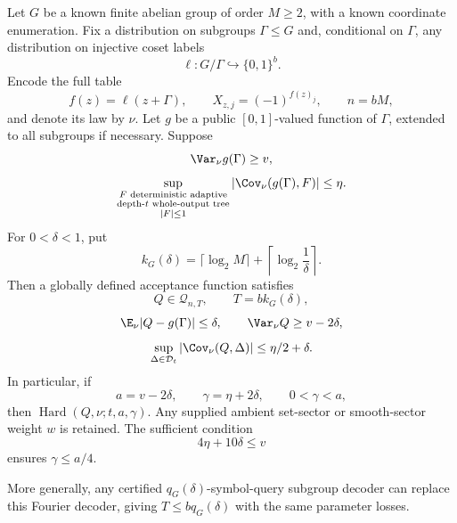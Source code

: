 \begin{theorem}\label{ian:period-hsp-finite-hsp}
Let \(G\) be a known finite abelian group of order \(M\ge2\), with a known coordinate enumeration. Fix a distribution on subgroups \(\Gamma\le G\) and, conditional on \(\Gamma\), any distribution on injective coset labels
\[
 \ell:G/\Gamma\hookrightarrow\{0,1\}^b.
\]
Encode the full table
\[
 f(z)=\ell(z+\Gamma),\qquad
 X_{z,j}=(-1)^{f(z)_j},\qquad n=bM,
\]
and denote its law by \(\nu\).
Let \(g\) be a public \([0,1]\)-valued function of \(\Gamma\), extended to all subgroups if necessary. Suppose
\[
 \Var_\nu g(\Gamma)\ge v,
\]
\[
 \sup_{\substack{F\text{ deterministic adaptive}\\
                  \text{depth-}t\text{ whole-output tree}\\
                  |F|\le1}}
 |\Cov_\nu(g(\Gamma),F)|\le\eta.
\]
For \(0<\delta<1\), put
\[
 k_G(\delta)=
 \lceil\log_2 M\rceil+\left\lceil\log_2\frac1\delta\right\rceil.
\]
Then a globally defined acceptance function satisfies
\[
 Q\in\mathcal Q_{n,T},\qquad T=bk_G(\delta),
\]
\[
 \E_\nu|Q-g(\Gamma)|\le\delta,\qquad
 \Var_\nu Q\ge v-2\delta,
\]
\[
 \sup_{\Delta\in\mathcal D_t}|\Cov_\nu(Q,\Delta)|
 \le\eta/2+\delta.
\]
In particular, if
\[
 a=v-2\delta,\qquad \gamma=\eta+2\delta,\qquad 0<\gamma<a,
\]
then \(\operatorname{Hard}(Q,\nu;t,a,\gamma)\).
Any supplied ambient set-sector or smooth-sector weight \(w\) is retained. The sufficient condition
\[
 4\eta+10\delta\le v
\]
ensures \(\gamma\le a/4\).

More generally, any certified \(q_G(\delta)\)-symbol-query subgroup decoder can replace this Fourier decoder, giving \(T\le bq_G(\delta)\) with the same parameter losses.
\end{theorem}

